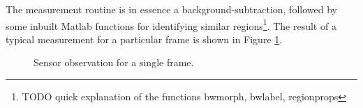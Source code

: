 The measurement routine is in essence a background-subtraction, followed by some
inbuilt Matlab functions for identifying similar regions\footnote{TODO quick
explanation of the functions bwmorph, bwlabel, regionprops}. The result of a
typical measurement for a particular frame is shown in Figure \ref{fig:observation}.

\begin{figure}[h]
\centering
{}
\caption{Sensor observation for a single frame.}
\label{fig:observation}
\end{figure}

